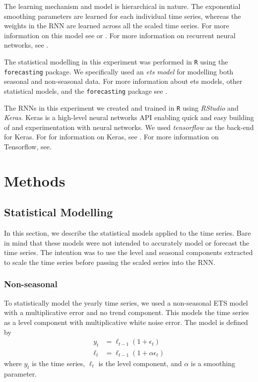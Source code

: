 \documentclass[a4paper,12pt]{article}
\theoremstyle{definition}
\begin{document}
The learning mechanism and model is hierarchical in nature. The exponential smoothing parameters are learned for each individual time series, whereas the weights in the RNN are learned across all the scaled time series. For more information on this model see \cite{smyl} or \cite{lit}. For more information on recurrent neural networks, see \cite{lit}.

The statistical modelling in this experiment was performed in \texttt{R} using the \texttt{forecasting} package. We specifically used an \textit{ets model} for modelling both seasonal and non-seasonal data. For more information about ets models, other statistical models, and the \texttt{forecasting} package see \cite{fpp}. 

The RNNs in this experiment we created and trained in \texttt{R} using \textit{RStudio} and \textit{Keras}. Keras is a high-level neural networks API enabling quick and easy building of and experimentation with neural networks. We used \textit{tensorflow} as the back-end for Keras. For for information on Keras, see \cite{keras}. For more information on Tensorflow, see\cite{tf}.

\section{Methods}

\subsection{Statistical Modelling}\label{sec:stats_modelling}
In this section, we describe the statistical models applied to the time series. Bare in mind that these models were not intended to accurately model or forecast the time series. The intention was to use the level and seasonal components extracted to scale the time series before passing the scaled series into the RNN.

\subsubsection{Non-seasonal}\label{sec:non_seasonal_stats_modelling}
To statistically model the yearly time series, we used a non-seasonal ETS model with a multiplicative error and no trend component. This models the time series as a level component with multiplicative white noise error. The model is defined by
\begin{align}
	y_t &= \ell_{t-1}(1 + \epsilon_t) \label{eq:non_seasonal_series} \\
	\ell_t &= \ell_{t-1}(1 + \alpha \epsilon_t) \label{eq:non_seasonal_level}
\end{align}
where $y_t$ is the time series, $\ell_t$ is the level component, and $\alpha$ is a smoothing parameter.
\end{document}
